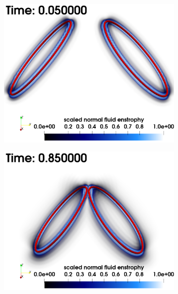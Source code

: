 \documentclass[%
 reprint,
 amsmath,amssymb,
 aps,
 prl,
]{revtex4-2}
\begin{document}
\begin{figure}[t]
	\centering
	\begin{subfigure}[b]{0.24\textwidth}
		\centering
		\includegraphics*[width=\textwidth]{snap-1.png}
	\end{subfigure}
	\begin{subfigure}[b]{0.24\textwidth}
		\centering
		\includegraphics*[width=\textwidth]{snap-2.png}
	\end{subfigure}
    \begin{subfigure}[b]{0.24\textwidth}

\end{subfigure}
\end{figure}
\end{document}
